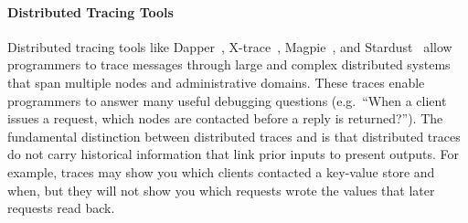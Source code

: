 \paragraph{Distributed Tracing Tools}
Distributed tracing tools like Dapper~\cite{sigelman2010dapper},
X-trace~\cite{fonseca2007x}, Magpie~\cite{barham2003magpie}, and
Stardust~\cite{thereska2006stardust} allow programmers to trace messages
through large and complex distributed systems that span multiple nodes and
administrative domains. These traces enable programmers to answer many useful
debugging questions (e.g.\ ``When a client issues a request, which nodes are
contacted before a reply is returned?''). The fundamental distinction between
distributed traces and \watprovenance{} is that distributed traces do not carry
historical information that link prior inputs to present outputs.  For example,
traces may show you which clients contacted a key-value store and when, but
they will not show you which requests wrote the values that later requests read
back.
